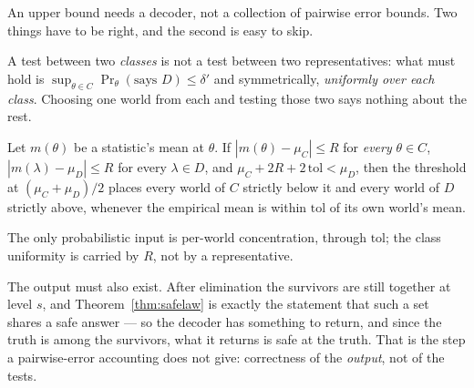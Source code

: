 An upper bound needs a decoder, not a collection of pairwise error bounds. Two things have to
be right, and the second is easy to skip.

A test between two \emph{classes} is not a test between two representatives: what must hold
is $\sup_{\theta\in C}\Pr_{\theta}(\text{says }D)\le\delta'$ and symmetrically,
\emph{uniformly over each class}. Choosing one world from each and testing those two says
nothing about the rest.

\begin{theorem}
\label{thm:composite}
Let $m(\theta)$ be a statistic's mean at $\theta$. If $|m(\theta)-\mu_{C}|\le R$ for
\emph{every} $\theta\in C$, $|m(\lambda)-\mu_{D}|\le R$ for every $\lambda\in D$, and
$\mu_{C}+2R+2\,\mathrm{tol}<\mu_{D}$, then the threshold at $(\mu_{C}+\mu_{D})/2$ places
every world of $C$ strictly below it and every world of $D$ strictly above, whenever the
empirical mean is within $\mathrm{tol}$ of its own world's mean.
\end{theorem}

The only probabilistic input is per-world concentration, through $\mathrm{tol}$; the class
uniformity is carried by $R$, not by a representative.

The output must also exist. After elimination the survivors are still together at level $s$,
and Theorem~\ref{thm:safelaw} is exactly the statement that such a set shares a safe answer
--- so the decoder has something to return, and since the truth is among the survivors, what
it returns is safe at the truth. That is the step a pairwise-error accounting does not give:
correctness of the \emph{output}, not of the tests.



